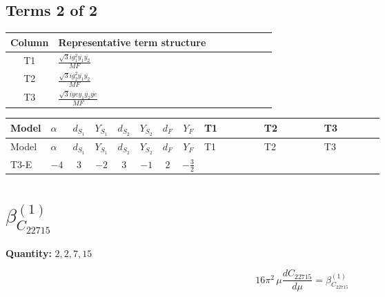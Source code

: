 \documentclass[8pt]{article}
\begin{document}
\begin{landscape}
\subsection*{Terms 2 of 2}
\begin{center}
\begin{tabular}{@{}c >{\raggedright\arraybackslash}p{0.82\linewidth}@{}}
\toprule
Column & Representative term structure \\
\midrule
T1 & \(\displaystyle \frac{\sqrt{3} i g_{1}^{2} \overline{y_{1}} \overline{y_{2}}}{MF}\) \\
\midrule
T2 & \(\displaystyle \frac{\sqrt{3} i g_{2}^{2} \overline{y_{1}} \overline{y_{2}}}{MF}\) \\
\midrule
T3 & \(\displaystyle \frac{\sqrt{3} i ye \overline{y_{1}} \overline{y_{2}} \overline{ye}}{MF}\) \\
\midrule
\bottomrule
\end{tabular}
\end{center}
\smallskip
\tiny
\begin{longtable}{@{}llcccccc >{\raggedright\arraybackslash}p{0.21\linewidth} >{\raggedright\arraybackslash}p{0.21\linewidth} >{\raggedright\arraybackslash}p{0.21\linewidth}@{}}
\toprule
Model & $\alpha$ & $d_{S_1}$ & $Y_{S_1}$ & $d_{S_2}$ & $Y_{S_2}$ & $d_F$ & $Y_F$ & T1 & T2 & T3 \\
\midrule
\endfirsthead
\toprule
Model & $\alpha$ & $d_{S_1}$ & $Y_{S_1}$ & $d_{S_2}$ & $Y_{S_2}$ & $d_F$ & $Y_F$ & T1 & T2 & T3 \\
\midrule
\endhead
T3-E & $-4$ & $3$ & $-2$ & $3$ & $-1$ & $2$ & $-\frac{3}{2}$ & \scriptsize\adjustbox{max width=\linewidth}{$\begin{gathered} \frac{9 \sqrt{3} i g_{1}^{2} \overline{y_{1}} \overline{y_{2}}}{8 MF}\end{gathered}$} & \scriptsize\adjustbox{max width=\linewidth}{$\begin{gathered} \frac{11 \sqrt{3} i g_{2}^{2} \overline{y_{1}} \overline{y_{2}}}{8 MF}\end{gathered}$} & \scriptsize\adjustbox{max width=\linewidth}{$\begin{gathered} - \frac{\sqrt{3} i ye \overline{y_{1}} \overline{y_{2}} \overline{ye}}{12 MF}\end{gathered}$} \\
\midrule
\bottomrule
\end{longtable}
\clearpage
\section*{$\beta_{C_{22715}}^{(1)}$}
\noindent\textbf{Quantity: }$\mathrm{2,2,7,15}$\par\smallskip
\[16\pi^2\,\mu\frac{d C_{22715}}{d\mu}=\beta_{C_{22715}}^{(1)}\]

\end{landscape}
\end{document}
